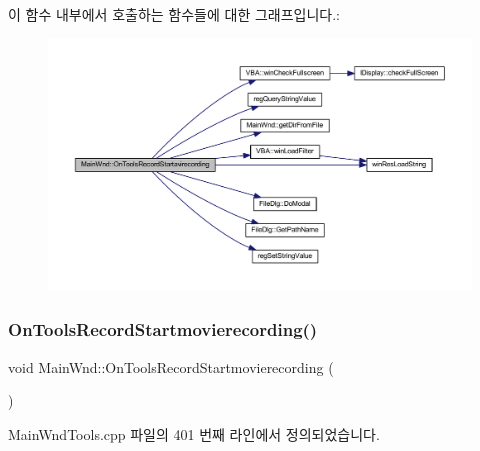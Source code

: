 이 함수 내부에서 호출하는 함수들에 대한 그래프입니다.\+:
\nopagebreak
\begin{figure}[H]
\begin{center}
\leavevmode
\includegraphics[width=350pt]{class_main_wnd_ae512a86963451914ea7eee95c85d6280_cgraph}
\end{center}
\end{figure}
\mbox{\label{class_main_wnd_af473a4d7ccfadb980b92de352ea6a4ae}} 
\subsubsection{\texorpdfstring{On\+Tools\+Record\+Startmovierecording()}{OnToolsRecordStartmovierecording()}}
{\footnotesize\ttfamily void Main\+Wnd\+::\+On\+Tools\+Record\+Startmovierecording (\begin{DoxyParamCaption}{ }\end{DoxyParamCaption})\hspace{0.3cm}{\ttfamily [protected]}}



Main\+Wnd\+Tools.\+cpp 파일의 401 번째 라인에서 정의되었습니다.


